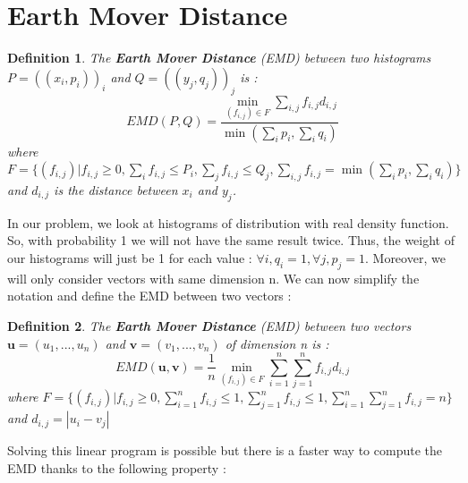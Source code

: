 \documentclass{article}
\begin{document}
	\section{Earth Mover Distance}
	 \newtheorem{definition}{Definition}
	 \begin{definition}
	 The \textbf{Earth Mover Distance} (EMD) between two histograms $P=((x_i,p_i))_i$ and $Q=((y_j,q_j))_j$ is :
	 \begin{equation*}	 
	 EMD(P,Q) = \frac{\min\limits_{(f_{i,j}) \in F} \sum_{i,j} f_{i,j} d_{i,j}}{ \min(\sum_i p_i, \sum_i q_i)}
	 \end{equation*}
	 \newline
	 where \begin{math}F=\{(f_{i,j})| f_{i,j}\geq 0,\sum\limits_{i} f_{i,j} \leq P_i, \sum\limits_{j} f_{i,j} \leq Q_j, \sum\limits_{i,j} f_{i,j} = \min(\sum\limits_i p_i, \sum\limits_i q_i)\} \end{math}\newline
	 and $d_{i,j}$ is the distance between $x_i$ and $y_j$.
	\end{definition}
	
	In our problem, we look at histograms of distribution with real density function. So, with probability 1 we will not have the same result twice. Thus, the weight of our histograms will just be 1 for each value : $\forall i, q_i =1, \forall j, p_j=1$.\newline
	Moreover, we will only consider vectors with same dimension n. We can now simplify the notation and define the EMD between two vectors :
	
	
	\begin{definition}
	 The \textbf{Earth Mover Distance} (EMD) between two vectors $\textbf{u}=(u_1,...,u_n)$ and $\textbf{v}=(v_1,...,v_n)$ of dimension n is :
	 \begin{equation*}
	 EMD(\textbf{u},\textbf{v}) = \frac{1}{n}\min\limits_{(f_{i,j}) \in F} \sum_{i=1}^n \sum_{j=1}^n f_{i,j} d_{i,j}
	 \end{equation*}
	 \newline
	 where \begin{math}F=\{(f_{i,j})| f_{i,j}\geq 0,\sum\limits_{i=1}^n f_{i,j} \leq 1, \sum\limits_{j=1}^n f_{i,j} \leq 1, \sum\limits_{i=1}^n \sum\limits_{j=1}^n f_{i,j} = n\}\end{math}
	 \newline
	 and $d_{i,j}=|u_i-v_j|$
	\end{definition}
	
	Solving this linear program is possible but there is a faster way to compute the EMD thanks to the following property : 
	
\end{document}
